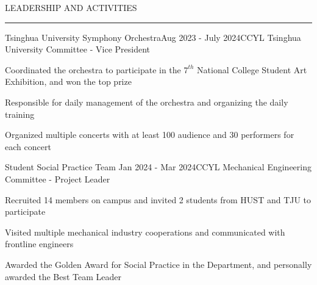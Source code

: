 \documentclass{resume} %
\renewenvironment{rSection}[1]{
\sectionskip
\textcolor{TsinghuaPurple}{\MakeUppercase{#1}}
\sectionlineskip
\hrule
\begin{list}{}{
\setlength{\leftmargin}{0em}
}
\item[]
}{
\end{list}
}
\begin{document}
 
  
\begin{rSection}{LEADERSHIP AND ACTIVITIES}

\begin{rSubsection}{Tsinghua University Symphony Orchestra}{Aug 2023 - July 2024}{CCYL Tsinghua University Committee - Vice President}{}              
\item Coordinated the orchestra to participate in the $7^{th}$ National College Student Art Exhibition, and won the top prize
\item Responsible for daily management of the orchestra and organizing the daily training
\item Organized multiple concerts with at least 100 audience and 30 performers for each concert
\end{rSubsection}  


\begin{rSubsection}{Student Social Practice Team} {Jan 2024 - Mar 2024}{CCYL Mechanical Engineering Committee - Project Leader}{} 
\item Recruited 14 members on campus and invited 2 students from HUST and TJU to participate      
\item Visited multiple mechanical industry cooperations and communicated with frontline engineers
\item Awarded the Golden Award for Social Practice in the Department, and personally awarded the Best Team Leader  
\end{rSubsection}

\end{rSection}
  



 
\end{document}
